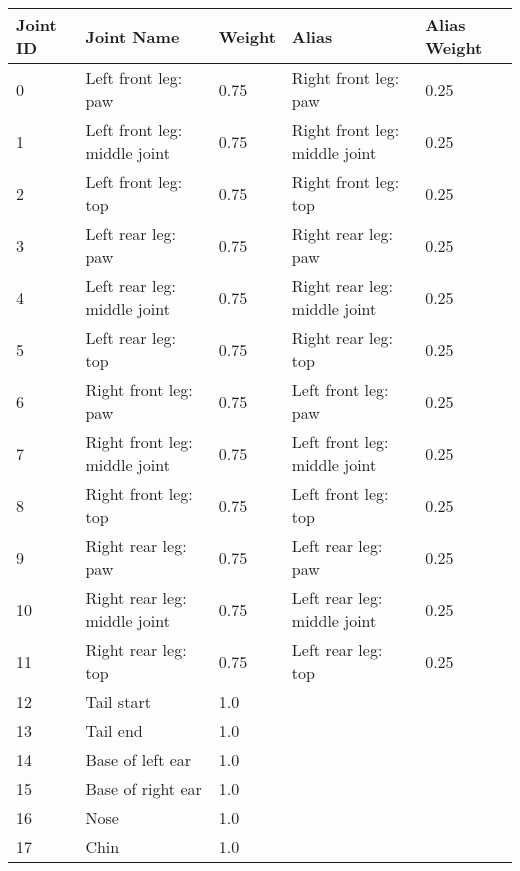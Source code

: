 \begin{table}[]
    \begin{tabular}{@{}lllll@{}}
    \toprule
    Joint ID & Joint Name                    & Weight & Alias                         & Alias Weight \\ \midrule
    0        & Left front leg: paw           & 0.75   & Right front leg: paw          & 0.25         \\
    1        & Left front leg: middle joint  & 0.75   & Right front leg: middle joint & 0.25         \\
    2        & Left front leg: top           & 0.75   & Right front leg: top          & 0.25         \\
    3        & Left rear leg: paw            & 0.75   & Right rear leg: paw           & 0.25         \\
    4        & Left rear leg: middle joint   & 0.75   & Right rear leg: middle joint  & 0.25         \\
    5        & Left rear leg: top            & 0.75   & Right rear leg: top           & 0.25         \\
    6        & Right front leg: paw          & 0.75   & Left front leg: paw           & 0.25         \\
    7        & Right front leg: middle joint & 0.75   & Left front leg: middle joint  & 0.25         \\
    8        & Right front leg: top          & 0.75   & Left front leg: top           & 0.25         \\
    9        & Right rear leg: paw           & 0.75   & Left rear leg: paw            & 0.25         \\
    10       & Right rear leg: middle joint  & 0.75   & Left rear leg: middle joint   & 0.25         \\
    11       & Right rear leg: top           & 0.75   & Left rear leg: top            & 0.25         \\
    12       & Tail start                    & 1.0    &                               &              \\
    13       & Tail end                      & 1.0    &                               &              \\
    14       & Base of left ear              & 1.0    &                               &              \\
    15       & Base of right ear             & 1.0    &                               &              \\
    16       & Nose                          & 1.0    &                               &              \\
    17       & Chin                          & 1.0    &                               &             
    \end{tabular}
\end{table}\label{tab:joint_weights}